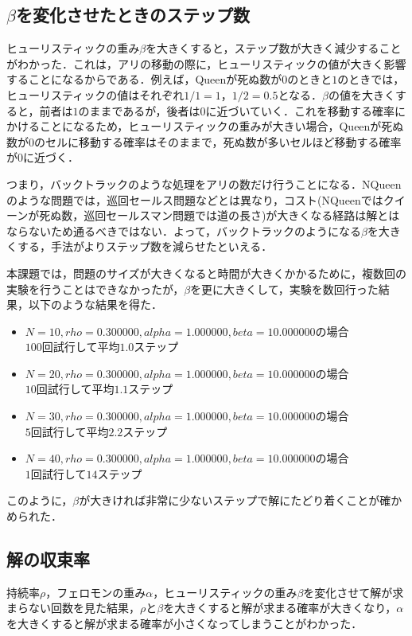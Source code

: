 \documentclass{jarticle}
\begin{document}
\subsection{$\beta$を変化させたときのステップ数}
\label{sec:think_beta}
ヒューリスティックの重み$\beta$を大きくすると，ステップ数が大きく減少することがわかった．これは，アリの移動の際に，ヒューリスティックの値が大きく影響することになるからである．例えば，Queenが死ぬ数が$0$のときと$1$のときでは，ヒューリスティックの値はそれぞれ$1/1=1$，$1/2=0.5$となる．$\beta$の値を大きくすると，前者は$1$のままであるが，後者は$0$に近づいていく．これを移動する確率にかけることになるため，ヒューリスティックの重みが大きい場合，Queenが死ぬ数が$0$のセルに移動する確率はそのままで，死ぬ数が多いセルほど移動する確率が$0$に近づく．

つまり，バックトラックのような処理をアリの数だけ行うことになる．NQueenのような問題では，巡回セールス問題などとは異なり，コスト(NQueenではクイーンが死ぬ数，巡回セールスマン問題では道の長さ)が大きくなる経路は解とはならないため通るべきではない．よって，バックトラックのようになる$\beta$を大きくする，手法がよりステップ数を減らせたといえる．

本課題では，問題のサイズが大きくなると時間が大きくかかるために，複数回の実験を行うことはできなかったが，$\beta$を更に大きくして，実験を数回行った結果，以下のような結果を得た．

\begin{itemize}
	\item $N = 10, rho = 0.300000, alpha = 1.000000, beta = 10.000000$の場合\\
		$100$回試行して平均$1.0$ステップ
	\item $N = 20, rho = 0.300000, alpha = 1.000000, beta = 10.000000$の場合\\
		$10$回試行して平均$1.1$ステップ
	\item $N = 30, rho = 0.300000, alpha = 1.000000, beta = 10.000000$の場合\\
		$5$回試行して平均$2.2$ステップ
	\item $N = 40, rho = 0.300000, alpha = 1.000000, beta = 10.000000$の場合\\
		$1$回試行して$14$ステップ
\end{itemize}

このように，$\beta$が大きければ非常に少ないステップで解にたどり着くことが確かめられた．


\subsection{解の収束率}
持続率$\rho$，フェロモンの重み$\alpha$，ヒューリスティックの重み$\beta$を変化させて解が求まらない回数を見た結果，$\rho$と$\beta$を大きくすると解が求まる確率が大きくなり，$\alpha$を大きくすると解が求まる確率が小さくなってしまうことがわかった．
\end{document}
